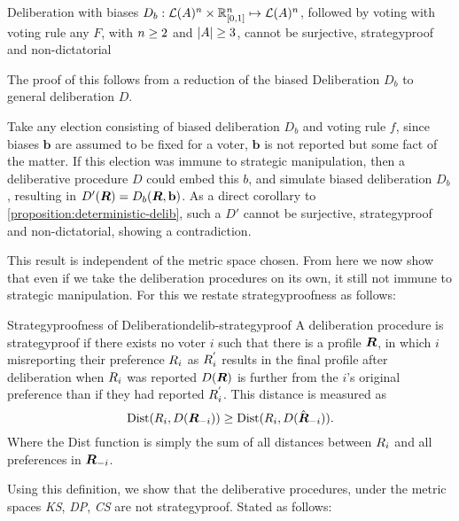 \begin{corollary}
	Deliberation with biases ${D}_b: \mathcal{L}(A) ^ n \times \mathbb{R}_{[0,1]}^n \mapsto \mathcal{L}(A)^n$, followed by voting with voting rule any $F$, with \(n \geq 2\) and \(|A| \geq 3\), cannot be surjective, strategyproof and non-dictatorial

	\label{corollary:biased-delib}
\end{corollary}

The proof of this follows from a reduction of the biased Deliberation $D_b$ to general deliberation $D$.

\begin{proofc}{}
	Take any election consisting of biased deliberation $D_b$ and voting rule $f$, since biases $\mathbf{b}$ are assumed to be fixed for a voter, $\mathbf{b}$ is not reported but some fact of the matter. If this election was immune to strategic manipulation, then a deliberative procedure $D$ could embed this $b$, and simulate biased deliberation $D_b$, resulting in $D'(\boldsymbol{R}) = D_b(\boldsymbol{R}, \mathbf{b})$. As a direct corollary to \cref{proposition:deterministic-delib}, such a $D'$ cannot be surjective, strategyproof and non-dictatorial, showing a contradiction.
\end{proofc}

This result is independent of the metric space chosen. From here we now show that even if we take the deliberation procedures on its own, it still not immune to strategic manipulation. For this we restate strategyproofness as follows:

\begin{definition}{Strategyproofness of Deliberation}{delib-strategyproof}
	A deliberation procedure is strategyproof if there exists no voter $i$ such that there is a profile $\boldsymbol{R}$, in which $i$ misreporting their preference $R_{i}$ as $R_{i}^{'}$ results in the final profile after deliberation  when $R_{i}$ was reported $D(\boldsymbol{R})$ is further from the $i$'s original preference than if they had reported $R_{i}^{'}$. This distance is measured as
	\[\operatorname{Dist}(R_{i}, D(\boldsymbol{R}_{-i})) \geq \operatorname{Dist}(R_{i}, D(\hat{\boldsymbol{R}}_{-i})).\]
	Where the Dist function is simply the sum of all distances between $R_i$ and all preferences in $\boldsymbol{R}_{-i}$.
\end{definition}

Using this definition, we show that the deliberative procedures, under the metric spaces \textit{KS}, \textit{ DP}, \textit{ CS} are not strategyproof. Stated as follows:

